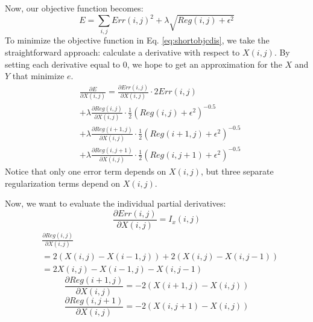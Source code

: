 \documentclass[10pt,twocolumn,letterpaper]{article}
\begin{document}
Now, our objective function becomes:
\begin{equation} \label{eq:shortobjcdis}
E = \sum_{i,j} Err(i,j)^2 + \lambda \sqrt{Reg(i,j) + \epsilon^2 }
\end{equation}
To minimize the objective function in Eq. \ref{eq:shortobjcdis}, we take the straightforward approach: calculate a derivative with respect to $X(i, j)$.  By setting each derivative equal to $0$, we hope to get an approximation for the $X$ and $Y$ that minimize $e$.
\begin{equation}
\begin{aligned}
&\frac{\partial E}{\partial X(i, j)} = \frac{\partial Err(i,j)}{\partial X(i, j)} \cdot 2 Err(i, j) \\
&+ \lambda \frac{\partial Reg(i,j)}{\partial X(i, j)} \cdot \frac{1}{2} (Reg(i, j) + \epsilon^2)^{-0.5}  \\
&+ \lambda \frac{\partial Reg(i+1,j)}{\partial X(i, j)} \cdot \frac{1}{2} (Reg(i+1, j) + \epsilon^2)^{-0.5}  \\
&+ \lambda \frac{\partial Reg(i,j+1)}{\partial X(i, j)} \cdot \frac{1}{2} (Reg(i, j+1) + \epsilon^2)^{-0.5}
\end{aligned}
\label{eq:dedx}
\end{equation}
Notice that only one error term depends on $X(i, j)$, but three separate regularization terms depend on $X(i, j)$.

Now, we want to evaluate the individual partial derivatives:
\begin{equation} \label{eq:derrdx}
\frac{\partial Err(i,j)}{\partial X(i, j)} = I_x(i, j)
\end{equation}
\begin{equation} \label{eq:dreg1dx}
\begin{aligned}
&\frac{\partial Reg(i,j)}{\partial X(i, j)} \\
&= 2(X(i, j) - X(i-1, j)) + 2(X(i, j) - X(i, j-1)) \\
&= 2X(i,j) - X(i-1, j) - X(i,j-1)
\end{aligned}
\end{equation}
\begin{equation} \label{eq:dreg2dx}
\frac{\partial Reg(i+1,j)}{\partial X(i, j)} = -2(X(i+1,j) - X(i,j))
\end{equation}
\begin{equation} \label{eq:dreg3dx}
\frac{\partial Reg(i,j+1)}{\partial X(i, j)} = -2(X(i,j+1) - X(i,j))
\end{equation}
\end{document}
